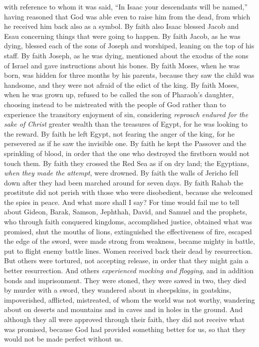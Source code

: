 \begin{biblechapter}
\verse with reference to whom it was said, “In Isaac your descendants will be named,”
\verse having reasoned that God was able even to raise him from the dead, from which he received him back also as a symbol.
\verse By faith also Isaac blessed Jacob and Esau concerning things that were going to happen.
\verse By faith Jacob, as he was dying, blessed each of the sons of Joseph and worshiped, leaning on the top of his staff.
\verse By faith Joseph, as he was dying, mentioned about the exodus of the sons of Israel and gave instructions about his bones.
\verse By faith Moses, when he was born, was hidden for three months by his parents, because they saw the child was handsome, and they were not afraid of the edict of the king.
\verse By faith Moses, when he was grown up, refused to be called the son of Pharaoh’s daughter,
\verse choosing instead to be mistreated with the people of God rather than to experience the transitory enjoyment of sin,
\verse considering \textit{reproach endured for the sake of Christ} greater wealth than the treasures of Egypt, for he was looking to the reward.
\verse By faith he left Egypt, not fearing the anger of the king, for he persevered as if he saw the invisible one.
\verse By faith he kept the Passover and the sprinkling of blood, in order that the one who destroyed the firstborn would not touch them.
\verse By faith they crossed the Red Sea as if on dry land; the Egyptians, \textit{when they made the attempt}, were drowned.
\verse By faith the walls of Jericho fell down after they had been marched around for seven days.
\verse By faith Rahab the prostitute did not perish with those who were disobedient, because she welcomed the spies in peace.
\verse And what more shall I say? For time would fail me to tell about Gideon, Barak, Samson, Jephthah, David, and Samuel and the prophets,
\verse who through faith conquered kingdoms, accomplished justice, obtained what was promised, shut the mouths of lions,
\verse extinguished the effectiveness of fire, escaped the edge of the sword, were made strong from weakness, became mighty in battle, put to flight enemy battle lines.
\verse Women received back their dead by resurrection. But others were tortured, not accepting release, in order that they might gain a better resurrection.
\verse And others \textit{experienced mocking and flogging}, and in addition bonds and imprisonment.
\verse They were stoned, they were sawed in two, they died by murder with a sword, they wandered about in sheepskins, in goatskins, impoverished, afflicted, mistreated,
\verse of whom the world was not worthy, wandering about on deserts and mountains and in caves and in holes in the ground.
\verse And although they all were approved through their faith, they did not receive what was promised,
\verse because God had provided something better for us, so that they would not be made perfect without us.
\end{biblechapter}

